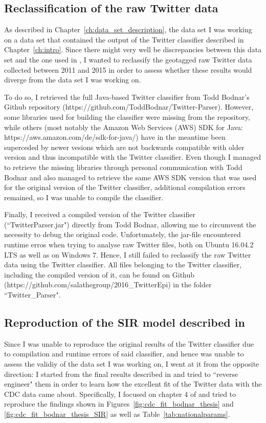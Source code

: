 \documentclass[11pt, a4paper,twoside]{report}\usepackage[]{graphicx}\usepackage[]{color}
\begin{document}
\subsection{Reclassification of the raw Twitter data}
As described in Chapter~\ref{ch:data_set_description}, the data set I was working on a data set that contained the output of the Twitter classifier described in Chapter~\ref{ch:intro}. Since there might very well be discrepancies between this data set and the one used in \citep{bodnar_data_2015}, I wanted to reclassify the geotagged raw Twitter data collected between 2011 and 2015 in order to assess whether these results would diverge from the data set I was working on.

To do so, I retrieved the full Java-based Twitter classifier from Todd Bodnar's Github repository (https://github.com/ToddBodnar/Twitter-Parser). However, some libraries used for building the classifier were missing from the repository, while others (most notably the Amazon Web Services (AWS) SDK for Java: https://aws.amazon.com/de/sdk-for-java/) have in the meantime been superceded by newer vesions which are not backwards compatible with older version and thus incompatible with the Twitter classifier. Even though I managed to retrieve the missing libraries through personal communication with Todd Bodnar and also managed to retrieve the same AWS SDK version that was used for the original version of the Twitter classifier, additional compilation errors remained, so I was unable to compile the classifier.

Finally, I received a compiled version of the Twitter classifier (``TwitterParser.jar") directly from Todd Bodnar, allowing me to circumvent the necessity to debug the original code.  Unfortunately, the jar-file encountered runtime erros when trying to analyse raw Twitter files, both on Ubuntu 16.04.2 LTS as well as on Windows 7. Hence, I still failed to reclassify the raw Twitter data using the Twitter classifier. All files belonging to the Twitter classifier, including the compiled version of it, can be found on Github (https://github.com/salathegroup/2016\_TwitterEpi) in the folder ``Twitter\_Parser".

\subsection{Reproduction of the SIR model described in \cite{bodnar_data_2015}}
Since I was unable to reproduce the original results of the Twitter classifier due to compilation and runtime errors of said classifier, and hence was unable to assess the validiy of the data set I was working on, I went at it from the opposite direction: I started from the final results described in \cite{bodnar_data_2015} and tried to ``reverse engineer" them in order to learn how the excellent fit of the Twitter data with the CDC data came about. Specifically, I focused on chapter 4 of \cite{bodnar_data_2015} and tried to reproduce the findings shown in Figures~\ref{fig:cdc_fit_bodnar_thesis} and \ref{fig:cdc_fit_bodnar_thesis_SIR} as well as Table~\ref{tab:nationalparams}.
\end{document}
